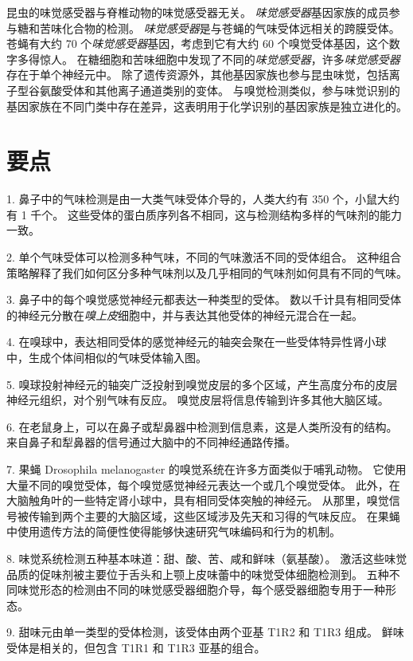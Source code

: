 昆虫的味觉感受器与脊椎动物的味觉感受器无关。
\textit{味觉感受器}基因家族的成员参与糖和苦味化合物的检测。
\textit{味觉感受器}是与苍蝇的气味受体远相关的跨膜受体。
苍蝇有大约 70 个\textit{味觉感受器}基因，考虑到它有大约 60 个嗅觉受体基因，这个数字多得惊人。
在糖细胞和苦味细胞中发现了不同的\textit{味觉感受器}，许多\textit{味觉感受器}存在于单个神经元中。
除了遗传资源外，其他基因家族也参与昆虫味觉，包括离子型谷氨酸受体和其他离子通道类别的变体。
与嗅觉检测类似，参与味觉识别的基因家族在不同门类中存在差异，这表明用于化学识别的基因家族是独立进化的。



\section{要点}

1. 鼻子中的气味检测是由一大类气味受体介导的，人类大约有 350 个，小鼠大约有 1 千个。
这些受体的蛋白质序列各不相同，这与检测结构多样的气味剂的能力一致。


2. 单个气味受体可以检测多种气味，不同的气味激活不同的受体组合。
这种组合策略解释了我们如何区分多种气味剂以及几乎相同的气味剂如何具有不同的气味。


3. 鼻子中的每个嗅觉感觉神经元都表达一种类型的受体。
数以千计具有相同受体的神经元分散在\textit{嗅上皮}细胞中，并与表达其他受体的神经元混合在一起。


4. 在嗅球中，表达相同受体的感觉神经元的轴突会聚在一些受体特异性肾小球中，生成个体间相似的气味受体输入图。


5. 嗅球投射神经元的轴突广泛投射到嗅觉皮层的多个区域，产生高度分布的皮层神经元组织，对个别气味有反应。
嗅觉皮层将信息传输到许多其他大脑区域。


6. 在老鼠身上，可以在鼻子或犁鼻器中检测到信息素，这是人类所没有的结构。
来自鼻子和犁鼻器的信号通过大脑中的不同神经通路传播。


7. 果蝇 Drosophila melanogaster 的嗅觉系统在许多方面类似于哺乳动物。
它使用大量不同的嗅觉受体，每个嗅觉感觉神经元表达一个或几个嗅觉受体。
此外，在大脑触角叶的一些特定肾小球中，具有相同受体突触的神经元。
从那里，嗅觉信号被传输到两个主要的大脑区域，这些区域涉及先天和习得的气味反应。
在果蝇中使用遗传方法的简便性使得能够快速研究气味编码和行为的机制。


8. 味觉系统检测五种基本味道：甜、酸、苦、咸和鲜味（氨基酸）。
激活这些味觉品质的促味剂被主要位于舌头和上颚上皮味蕾中的味觉受体细胞检测到。
五种不同味觉形态的检测由不同的味觉感受器细胞介导，每个感受器细胞专用于一种形态。


9. 甜味元由单一类型的受体检测，该受体由两个亚基 T1R2 和 T1R3 组成。
鲜味受体是相关的，但包含 T1R1 和 T1R3 亚基的组合。



